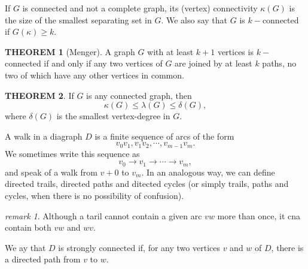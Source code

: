 \documentclass[a4paper,11pt]{article}%
\theoremstyle{remark}
\newtheorem*{remark}{remark}
\theoremstyle{definition}
\newtheorem{theorem}{THEOREM}[section]
\theoremstyle{definition}
\theoremstyle{definition}
\theoremstyle{definition}
\theoremstyle{plain}
\theoremstyle{definition}
\begin{document}
If $G$ is connected and not a complete graph,
its (vertex) connectivity $\kappa(G)$ is the size of the smallest separating 
set in $G$. We also say that $G$ is $k-$connected if $G(\kappa)\geq k$.
\begin{theorem}[Menger]
   A graph $G$ with at least $k+1$ vertices is $k-$connected if and only if 
   any two vertices of $G$ are joined by at least $k$ paths, no two 
   of which have any other vertices in common. 
\end{theorem}
\begin{theorem}
    If $G$ is any connected graph, then 
    \[\kappa(G)\leq\lambda(G)\leq\delta(G),\]
    where $\delta(G)$ is the smallest vertex-degree in $G$.
\end{theorem}
A walk in a diagraph $D$ is a finite sequence of arcs of the form 
\[v_0v_1,v_1v_2,\cdots,v_{m-1}v_m.\]
We sometimes write this sequence as 
\[v_0\rightarrow v_1\rightarrow\cdots\rightarrow v_m,\]
and speak of a walk from $v+0$ to $v_m$. In an analogous way, we can define 
directed trails, directed paths and ditected cycles (or simply trails, 
paths and cycles, when there is no possibility of confusion).
\begin{remark}
    Although a taril cannot contain a given arc $vw$ more than once, it cna 
    contain both $vw$ and $wv$.
\end{remark}
We ay that $D$ is strongly connected if, for any two 
vertices $v$ and $w$ of $D$, there is a directed path from $v$ to $w$.
\end{document}
